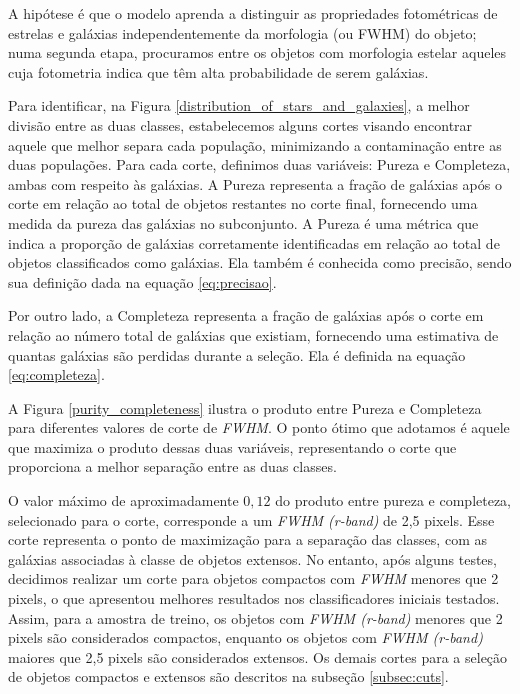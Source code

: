 A hipótese é que o modelo aprenda a distinguir as propriedades fotométricas de estrelas e galáxias independentemente da morfologia (ou FWHM) do objeto; numa segunda etapa, procuramos entre os objetos com morfologia estelar aqueles cuja fotometria indica que têm alta probabilidade de serem galáxias.

Para identificar, na Figura \ref{distribution_of_stars_and_galaxies}, a melhor divisão entre as duas classes, estabelecemos alguns cortes visando encontrar aquele que melhor separa cada população, minimizando a contaminação entre as duas populações. Para cada corte, definimos duas variáveis: Pureza e Completeza, ambas com respeito às galáxias. A Pureza representa a fração de galáxias após o corte em relação ao total de objetos restantes no corte final, fornecendo uma medida da pureza das galáxias no subconjunto. A Pureza é uma métrica que indica a proporção de galáxias corretamente identificadas em relação ao total de objetos classificados como galáxias. Ela também é conhecida como precisão, sendo sua definição dada na equação \ref{eq:precisao}.

Por outro lado, a Completeza representa a fração de galáxias após o corte em relação ao número total de galáxias que existiam, fornecendo uma estimativa de quantas galáxias são perdidas durante a seleção. Ela é definida na equação \ref{eq:completeza}.

A Figura \ref{purity_completeness} ilustra o produto entre Pureza e Completeza para diferentes valores de corte de \textit{FWHM}. O ponto ótimo que adotamos é aquele que maximiza o produto dessas duas variáveis, representando o corte que proporciona a melhor separação entre as duas classes.

O valor máximo de aproximadamente $0,12$ do produto entre pureza e completeza, selecionado para o corte, corresponde a um \textit{FWHM (r-band)} de 2,5 pixels. Esse corte representa o ponto de maximização para a separação das classes, com as galáxias associadas à classe de objetos extensos. No entanto, após alguns testes, decidimos realizar um corte para objetos compactos com \textit{FWHM} menores que 2 pixels, o que apresentou melhores resultados nos classificadores iniciais testados. Assim, para a amostra de treino, os objetos com \textit{FWHM (r-band)} menores que 2 pixels são considerados compactos, enquanto os objetos com \textit{FWHM (r-band)} maiores que 2,5 pixels são considerados extensos. Os demais cortes para a seleção de objetos compactos e extensos são descritos na subseção \ref{subsec:cuts}.

